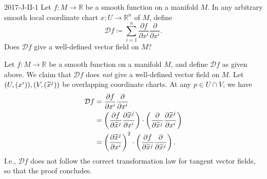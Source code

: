 \documentclass{article}
\begin{document}
	\begin{prb}{2017-J-II-1}
		Let $f: M \to \mathbb{R}$ be a smooth function on a manifold $M$. In any arbitrary smooth local coordinate chart $x: U \to \mathbb{R}^{n}$ of $M$, define 
		\begin{equation*}
			\mathcal{D}f \coloneqq \sum_{i = 1}^{n}\frac{\partial f}{\partial x^{i}}\frac{\partial}{\partial x^{i}}. 
		\end{equation*}
		Does $\mathcal{D}f$ give a well-defined vector field on $M$? 
	\end{prb}
	Let $f: M \to \mathbb{R}$ be a smooth function on a manifold $M$, and define $\mathcal{D}f$ as given above. We claim that $\mathcal{D}f$ does \textit{not} give a well-defined vector field on $M$. Let $(U, (x^{i})), (V, (\widetilde{x}^{j}))$ be overlapping coordinate charts. At any $p \in U \cap V$, we have 
	\begin{align*}
		\begin{split}
			\mathcal{D}f &= \frac{\partial f}{\partial x^{i}}\frac{\partial}{\partial x^{i}} \\
			&= \left(\frac{\partial f}{\partial \widetilde{x}^{j}}\frac{\partial \widetilde{x}^{j}}{\partial x^{i}}\right)\cdot \left(\frac{\partial}{\partial \widetilde{x}^{j}}\frac{\partial \widetilde{x}^{j}}{\partial x^{i}}\right) \\
			&= \left(\frac{\partial \widetilde{x}^{j}}{\partial x^{i}}\right)^{2}\cdot \left(\frac{\partial f}{\partial \widetilde{x}^{j}}\frac{\partial}{\partial \widetilde{x}^{j}}\right). 
		\end{split}
	\end{align*}
	I.e., $\mathcal{D}f$ does not follow the correct transformation law for tangent vector fields, so that the proof concludes.  
	
\end{document}
